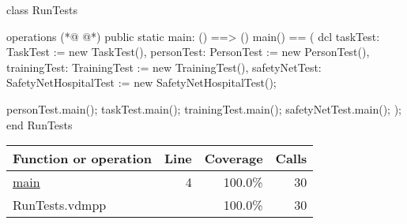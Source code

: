 \begin{vdmpp}[breaklines=true]
class RunTests

operations
(*@
\label{main:4}
@*)
 public static main: () ==> ()
   main() == (
    dcl taskTest: TaskTest := new TaskTest(), personTest: PersonTest := new PersonTest(), 
     trainingTest: TrainingTest := new TrainingTest(), safetyNetTest: SafetyNetHospitalTest := new SafetyNetHospitalTest();
    
    personTest.main();
    taskTest.main();    
    trainingTest.main();
    safetyNetTest.main();
   );
end RunTests
\end{vdmpp}
\bigskip
\begin{longtable}{|l|r|r|r|}
\hline
Function or operation & Line & Coverage & Calls \\
\hline
\hline
\hyperref[main:4]{main} & 4&100.0\% & 30 \\
\hline
\hline
RunTests.vdmpp & & 100.0\% & 30 \\
\hline
\end{longtable}


